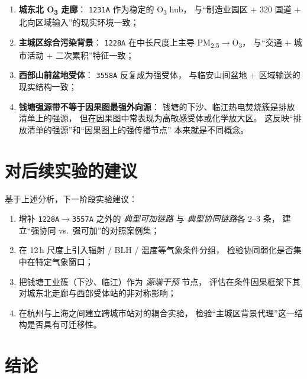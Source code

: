 \documentclass[11pt,a4paper]{article}
\begin{document}
\begin{enumerate}[leftmargin=2em]
  \item \textbf{城东北 O\textsubscript{3} 走廊}：
        \texttt{1231A} 作为稳定的 O\textsubscript{3} hub，
        与“制造业园区 + 320 国道 + 北向区域输入”的现实环境一致；
  \item \textbf{主城区综合污染背景}：
        \texttt{1228A} 在中长尺度上主导 PM\textsubscript{2.5}$\to$O\textsubscript{3}，
        与“交通 + 城市活动 + 二次累积”特征一致；
  \item \textbf{西部山前盆地受体}：
        \texttt{3558A} 反复成为强受体，
        与临安山间盆地 + 区域输送的现实结构一致；
  \item \textbf{钱塘强源带不等于因果图最强外向源}：
        钱塘的下沙、临江热电焚烧簇是排放清单上的强源，
        但在因果图中常表现为高敏感受体或化学放大区。
        这反映“排放清单的强源”和“因果图上的强传播节点”
        本来就是不同概念。
\end{enumerate}

\section{对后续实验的建议}

基于上述分析，下一阶段实验建议：

\begin{enumerate}[leftmargin=2em]
  \item 增补 \texttt{1228A$\to$3557A} 之外的 \emph{典型可加链路}
        与 \emph{典型协同链路}各 2--3 条，
        建立“强协同 vs.\ 强可加”的对照案例集；
  \item 在 12\,h 尺度上引入辐射 / BLH / 温度等气象条件分组，
        检验协同弱化是否集中在特定气象窗口；
  \item 把钱塘工业簇（下沙、临江）作为 \emph{源端干预} 节点，
        评估在条件因果框架下其对城东北走廊与西部受体站的非对称影响；
  \item 在杭州与上海之间建立跨城市站对的耦合实验，
        检验“主城区背景代理”这一结构是否具有可迁移性。
\end{enumerate}

\section{结论}
\end{document}
